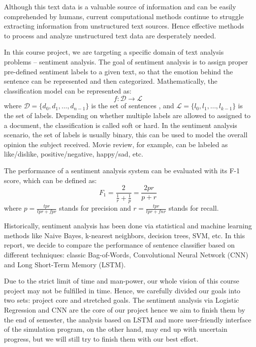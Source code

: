 \documentclass[conference]{IEEEtran}
\begin{document}
    Although this text data is a valuable source of information
    and can be easily comprehended by humans, current computational methods
    continue to struggle extracting information from unstructured text 
    sources.
    Hence effective methods to process and analyze unstructured text data are
    desperately needed.

    In this course project, we are targeting a specific domain of text analysis
    problems -- sentiment analysis. The goal of sentiment analysis is to assign
    proper pre-defined sentiment labels to a given text, so that the emotion behind the
    sentence can be represented and then categorized\cite{allahyari2017brief}.
    Mathematically, the classification model can be represented as:
    $$f:\mathcal{D}\rightarrow\mathcal{L}$$
    where $\mathcal{D}=\{d_0, d_1,\ldots, d_{n-1}\}$ is the set of sentences
    , and $\mathcal{L}=\{l_0, l_1,\ldots, l_{k-1}\}$ is the set of labels.
    Depending on whether multiple labels are allowed to assigned to a document, the
    classification is called soft or hard\cite{gopal2010multilabel}. In the sentiment 
    analysis scenario, the set of labels is usually binary, this can be used
    to model the overall opinion the subject received. Movie review, for example,
    can be labeled as like/dislike, positive/negative, happy/sad, etc.
    \cite{pang2002thumbs}

    The performance of a sentiment analysis system can be evaluated with its
    F-1 score, which can be defined as\cite{forman2003extensive}:
    $$F_1=\frac{2}{\frac{1}{r}+\frac{1}{p}}=\frac{2pr}{p+r}$$
    where $p=\frac{tpr}{tpr+fpr}$ stands for precision and $r=\frac{tpr}{tpr+fnr}$
    stands for recall.

    Historically, sentiment analysis has been done via statistical
    and machine learning methods like Naive Bayes, k-nearest neighbors, decision
    trees, SVM, etc. In this report, we decide to compare the performance of
    sentence classifier based on different techniques: 
    classic Bag-of-Words\cite{pang2002thumbs},
    Convolutional Neural Network (CNN)\cite{kim2014convolutional} 
    and Long Short-Term Memory (LSTM)\cite{barnes2017assessing}.
    
    Due to the strict limit of time and man-power, our whole vision of this course 
    project may not be fulfilled in time. Hence, we carefully divided our goals into 
    two sets: project core and stretched goals. The sentiment analysis via 
    Logistic Regression and CNN are the core of our project hence we aim to 
    finish them by the end of semester, the analysis based on LSTM and more
    user-friendly interface of the simulation program, on the other hand,
    may end up with uncertain progress, but we will still try to finish them 
    with our best effort.
    
\end{document}
